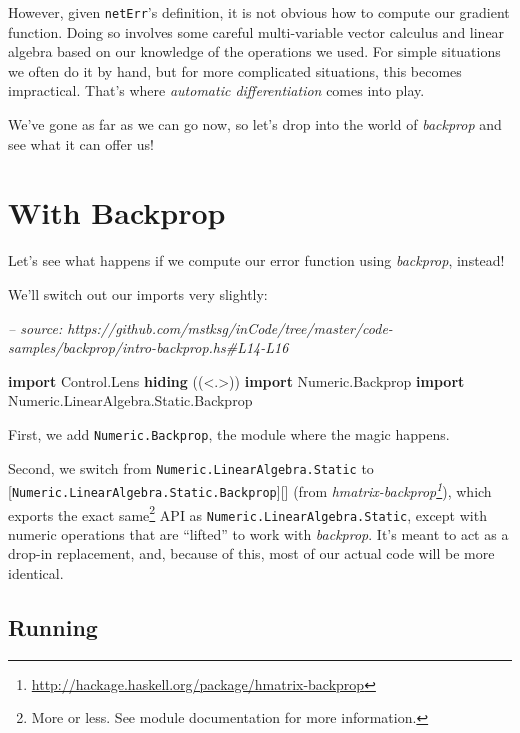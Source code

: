 \documentclass[]{article}
\newenvironment{Shaded}{}{}
\newcommand{\CommentTok}[1]{\textcolor[rgb]{0.38,0.63,0.69}{\textit{#1}}}
\newcommand{\DataTypeTok}[1]{\textcolor[rgb]{0.56,0.13,0.00}{#1}}
\newcommand{\KeywordTok}[1]{\textcolor[rgb]{0.00,0.44,0.13}{\textbf{#1}}}
\newcommand{\NormalTok}[1]{#1}
\renewcommand{\href}[2]{#2\footnote{\url{#1}}}
\begin{document}
However, given \texttt{netErr}'s definition, it is not obvious how to compute
our gradient function. Doing so involves some careful multi-variable vector
calculus and linear algebra based on our knowledge of the operations we used.
For simple situations we often do it by hand, but for more complicated
situations, this becomes impractical. That's where \emph{automatic
differentiation} comes into play.

We've gone as far as we can go now, so let's drop into the world of
\emph{backprop} and see what it can offer us!

\hypertarget{with-backprop}{%
\section{With Backprop}\label{with-backprop}}

Let's see what happens if we compute our error function using \emph{backprop},
instead!

We'll switch out our imports very slightly:

\begin{Shaded}
\begin{Highlighting}[]
\CommentTok{-- source: https://github.com/mstksg/inCode/tree/master/code-samples/backprop/intro-backprop.hs#L14-L16}

\KeywordTok{import}           \DataTypeTok{Control.Lens} \KeywordTok{hiding}\NormalTok{                   ((<.>))}
\KeywordTok{import}           \DataTypeTok{Numeric.Backprop}
\KeywordTok{import}           \DataTypeTok{Numeric.LinearAlgebra.Static.Backprop}
\end{Highlighting}
\end{Shaded}

First, we add \texttt{Numeric.Backprop}, the module where the magic happens.

Second, we switch from \texttt{Numeric.LinearAlgebra.Static} to
{[}\texttt{Numeric.LinearAlgebra.Static.Backprop}{]}{[}{]} (from
\emph{\href{http://hackage.haskell.org/package/hmatrix-backprop}{hmatrix-backprop}}),
which exports the exact same\footnote{More or less. See module documentation for
  more information.} API as \texttt{Numeric.LinearAlgebra.Static}, except with
numeric operations that are ``lifted'' to work with \emph{backprop}. It's meant
to act as a drop-in replacement, and, because of this, most of our actual code
will be more identical.

\hypertarget{running-1}{%
\subsection{Running}\label{running-1}}
\end{document}
